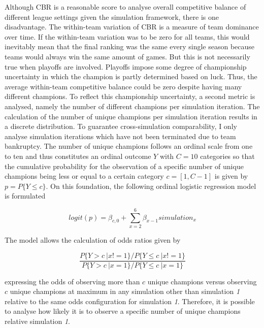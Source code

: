 \documentclass[12pt, a4paper]{article}
\begin{document}
\noindent
Although CBR is a reasonable score to analyse overall competitive balance of different league settings given the simulation framework, there is one disadvantage. The within-team variation of CBR is a measure of team dominance over time. If the within-team variation was to be zero for all teams, this would inevitably mean that the final ranking was the same every single season because teams would always win the same amount of games. But this is not necessarily true when playoffs are involved. Playoffs impose some degree of championship uncertainty in which the champion is partly determined based on luck. Thus, the average within-team competitive balance could be zero despite having many different champions. To reflect this championship uncertainty, a second metric is analysed, namely the number of different champions per simulation iteration. The calculation of the number of unique champions per simulation iteration results in a discrete distribution. To guarantee cross-simulation comparability, I only analyse simulation iterations which have not been terminated due to team bankruptcy. The number of unique champions follows an ordinal scale from one to ten and thus constitutes an ordinal outcome $Y$ with $C=10$ categories so that the cumulative probability for the observation of a specific number of unique champions being less or equal to a certain category $c = [1, C-1]$ is given by $p = P\{Y \leq c\}$. On this foundation, the following ordinal logistic regression model is formulated

\begin{equation}
\label{eq:averageGrowthRate}
logit(p) = \beta_{c,0} + \sum_{x=2}^6\beta_{x-1}simulation_x
\end{equation}

\noindent
The model allows the calculation of odds ratios given by 

\begin{equation}
\label{eq:averageGrowthRate}
\frac{P\{Y > c\ | x != 1\}/P\{Y \leq c\ | x != 1\}}{P\{Y > c\ | x = 1\}/P\{Y \leq c\ | x = 1\}}
\end{equation}

\noindent
expressing the odds of observing more than $c$ unique champions versus observing $c$ unique champions at maximum in any simulation other than simulation \textit{1} relative to the same odds configuration for simulation \textit{1}. Therefore, it is possible to analyse how likely it is to observe a specific number of unique champions relative simulation \textit{1}.  
\end{document}
